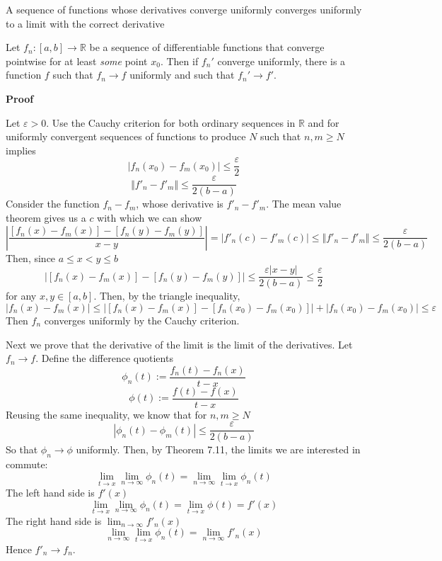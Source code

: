 \begin{theorem} A sequence of functions whose derivatives converge uniformly converges uniformly to a limit with the correct derivative

    Let $f_n: [a,b] \rightarrow \mathbb{R}$ be a sequence of differentiable functions that converge pointwise for at least \textit{some} point $x_0$. Then if $f_n'$ converge uniformly, there is a function $f$ such that $f_n \rightarrow f$ uniformly and such that $f_n' \rightarrow f'$.

    \textbf{Proof}

    Let $\varepsilon > 0$. Use the Cauchy criterion for both ordinary sequences in $\mathbb{R}$ and for uniformly convergent sequences of functions to produce $N$ such that $n, m \geq N$ implies
    \[|f_n(x_0) - f_m(x_0)| \leq \frac{\varepsilon}{2}\]
    \[\Vert f'_n - f'_m \Vert \leq \frac{\varepsilon}{2(b-a)}\]
    Consider the function $f_n - f_m$, whose derivative is $f'_n - f'_m$. The mean value theorem gives us a $c$ with which we can show
    \[\left|\frac{[f_n(x) - f_m(x)] - [f_n(y) - f_m(y)]}{x-y}\right| = |f'_n(c) - f'_m(c)| \leq \Vert f'_n - f'_m \Vert \leq \frac{\varepsilon}{2(b-a)}\]
    Then, since $a \leq x < y \leq b$
    \[\left|[f_n(x) - f_m(x)] - [f_n(y) - f_m(y)]\right| \leq \frac{\varepsilon|x-y|}{2(b-a)} \leq \frac{\varepsilon}{2}\]
    for any $x, y \in [a, b]$. Then, by the triangle inequality,
    \[|f_n(x) - f_m(x)| \leq |[f_n(x) - f_m(x)] - [f_n(x_0) - f_m(x_0)]| + |f_n(x_0) - f_m(x_0)| \leq \varepsilon\]
    Then $f_n$ converges uniformly by the Cauchy criterion.

    Next we prove that the derivative of the limit is the limit of the derivatives. Let $f_n \rightarrow f$. Define the difference quotients
    \[\phi_n(t) := \frac{f_n(t) - f_n(x)}{t-x}\]
    \[\phi(t) := \frac{f(t) - f(x)}{t-x}\]
    Reusing the same inequality, we know that for $n, m \geq N$
    \[|\phi_n(t) - \phi_m(t)| \leq \frac{\varepsilon}{2(b-a)}\]
    So that $\phi_n \rightarrow \phi$ uniformly. Then, by Theorem 7.11, the limits we are interested in commute:
    \[\lim_{t \to x} \lim_{n \to \infty} \phi_n(t) = \lim_{n \to \infty} \lim_{t \to x} \phi_n(t)\]
    The left hand side is $f'(x)$
    \[\lim_{t \to x} \lim_{n \to \infty} \phi_n(t) = \lim_{t \to x} \phi(t) = f'(x)\]
    The right hand side is $\lim_{n\to\infty} f'_n(x)$
    \[\lim_{n \to \infty} \lim_{t \to x} \phi_n(t) = \lim_{n \to \infty} f'_n(x)\]
    Hence $f'_n \rightarrow f_n$.
\end{theorem}

